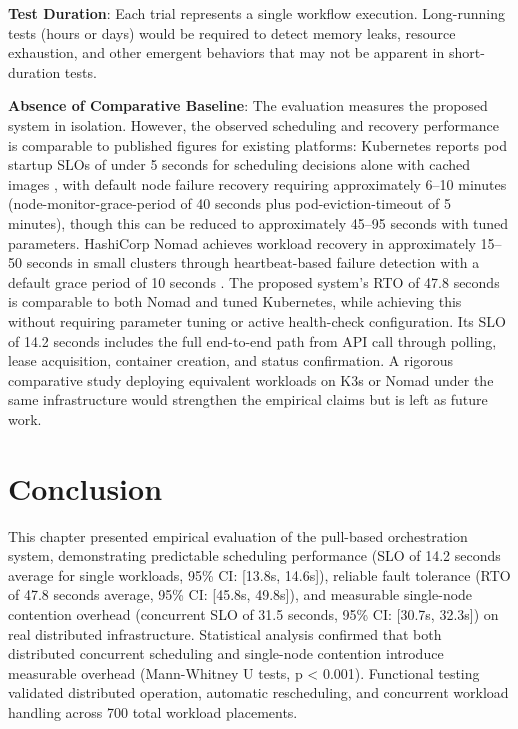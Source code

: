 \textbf{Test Duration}: Each trial represents a single workflow execution. Long-running tests (hours or days) would be required to detect memory leaks, resource exhaustion, and other emergent behaviors that may not be apparent in short-duration tests.

\textbf{Absence of Comparative Baseline}: The evaluation measures the proposed system in isolation. However, the observed scheduling and recovery performance is comparable to published figures for existing platforms: Kubernetes reports pod startup SLOs of under 5 seconds for scheduling decisions alone with cached images \cite{k8s_docs}, with default node failure recovery requiring approximately 6--10 minutes (node-monitor-grace-period of 40 seconds plus pod-eviction-timeout of 5 minutes), though this can be reduced to approximately 45--95 seconds with tuned parameters. HashiCorp Nomad achieves workload recovery in approximately 15--50 seconds in small clusters through heartbeat-based failure detection with a default grace period of 10 seconds \cite{nomad_docs}. The proposed system's RTO of 47.8 seconds is comparable to both Nomad and tuned Kubernetes, while achieving this without requiring parameter tuning or active health-check configuration. Its SLO of 14.2 seconds includes the full end-to-end path from API call through polling, lease acquisition, container creation, and status confirmation. A rigorous comparative study deploying equivalent workloads on K3s or Nomad under the same infrastructure would strengthen the empirical claims but is left as future work.

\section{Conclusion}

This chapter presented empirical evaluation of the pull-based orchestration system, demonstrating predictable scheduling performance (SLO of 14.2 seconds average for single workloads, 95\% CI: [13.8s, 14.6s]), reliable fault tolerance (RTO of 47.8 seconds average, 95\% CI: [45.8s, 49.8s]), and measurable single-node contention overhead (concurrent SLO of 31.5 seconds, 95\% CI: [30.7s, 32.3s]) on real distributed infrastructure. Statistical analysis confirmed that both distributed concurrent scheduling and single-node contention introduce measurable overhead (Mann-Whitney U tests, p < 0.001). Functional testing validated distributed operation, automatic rescheduling, and concurrent workload handling across 700 total workload placements.

